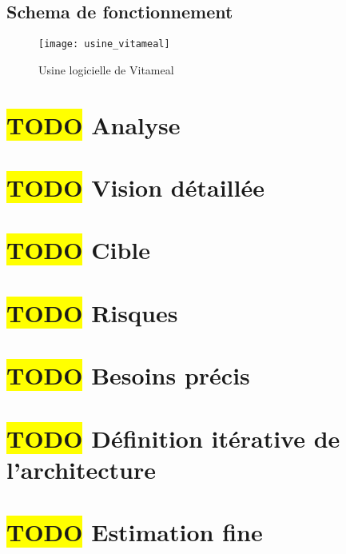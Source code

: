 \subsection{Schema de fonctionnement}

\begin{figure}[H]
	\label{Usine logicielle de Vitameal}
	\centering
	\texttt{[image: usine\_vitameal]} %
	\caption{Usine logicielle de Vitameal}
\end{figure}

\section{\colorbox{yellow}{TODO} Analyse}

\section{\colorbox{yellow}{TODO} Vision détaillée}

\section{\colorbox{yellow}{TODO} Cible}

\section{\colorbox{yellow}{TODO} Risques}

\section{\colorbox{yellow}{TODO} Besoins précis}

\section{\colorbox{yellow}{TODO} Définition itérative de l'architecture}

\section{\colorbox{yellow}{TODO} Estimation fine}
